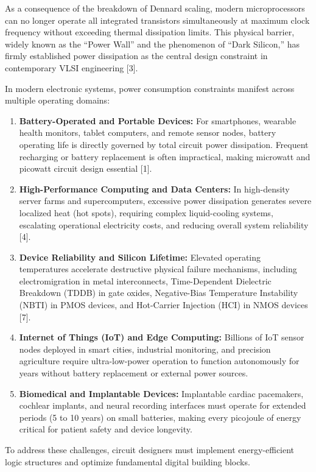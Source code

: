 \documentclass[12pt,a4paper,oneside]{report}
\begin{document}
As a consequence of the breakdown of Dennard scaling, modern microprocessors can no longer operate all integrated transistors simultaneously at maximum clock frequency without exceeding thermal dissipation limits. This physical barrier, widely known as the ``Power Wall'' and the phenomenon of ``Dark Silicon,'' has firmly established power dissipation as the central design constraint in contemporary VLSI engineering [3].

In modern electronic systems, power consumption constraints manifest across multiple operating domains:
\begin{enumerate}
\item \textbf{Battery-Operated and Portable Devices:} For smartphones, wearable health monitors, tablet computers, and remote sensor nodes, battery operating life is directly governed by total circuit power dissipation. Frequent recharging or battery replacement is often impractical, making microwatt and picowatt circuit design essential [1].
\item \textbf{High-Performance Computing and Data Centers:} In high-density server farms and supercomputers, excessive power dissipation generates severe localized heat (hot spots), requiring complex liquid-cooling systems, escalating operational electricity costs, and reducing overall system reliability [4].
\item \textbf{Device Reliability and Silicon Lifetime:} Elevated operating temperatures accelerate destructive physical failure mechanisms, including electromigration in metal interconnects, Time-Dependent Dielectric Breakdown (TDDB) in gate oxides, Negative-Bias Temperature Instability (NBTI) in PMOS devices, and Hot-Carrier Injection (HCI) in NMOS devices [7].
\item \textbf{Internet of Things (IoT) and Edge Computing:} Billions of IoT sensor nodes deployed in smart cities, industrial monitoring, and precision agriculture require ultra-low-power operation to function autonomously for years without battery replacement or external power sources.
\item \textbf{Biomedical and Implantable Devices:} Implantable cardiac pacemakers, cochlear implants, and neural recording interfaces must operate for extended periods (5 to 10 years) on small batteries, making every picojoule of energy critical for patient safety and device longevity.
\end{enumerate}

To address these challenges, circuit designers must implement energy-efficient logic structures and optimize fundamental digital building blocks.
\end{document}
